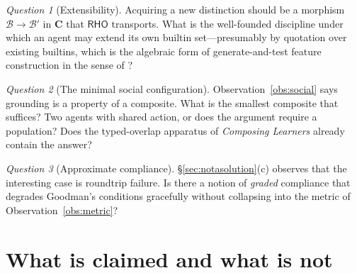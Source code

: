 \documentclass[11pt,a4paper]{article}
\theoremstyle{definition}
\theoremstyle{plain}
\theoremstyle{remark}
\newtheorem{question}{Question}
\newcommand{\RHO}{\mathsf{RHO}}
\newcommand{\Bee}{\mathcal{B}}
\newcommand{\Cat}{\mathbf{C}}
\begin{document}
\begin{question}[Extensibility]
Acquiring a new distinction should be a morphism $\Bee \to \Bee'$ in $\Cat$ that $\RHO$
transports. What is the well-founded discipline under which an agent may extend its own
builtin set---presumably by quotation over existing builtins, which is the algebraic form
of generate-and-test feature construction in the sense of \cite{pierce1997}?
\end{question}

\begin{question}[The minimal social configuration]
Observation~\ref{obs:social} says grounding is a property of a composite. What is the
smallest composite that suffices? Two agents with shared action, or does the argument
require a population? Does the typed-overlap apparatus of \emph{Composing Learners}
already contain the answer?
\end{question}

\begin{question}[Approximate compliance]
\S\ref{sec:notasolution}(c) observes that the interesting case is roundtrip failure. Is
there a notion of \emph{graded} compliance that degrades Goodman's conditions gracefully
without collapsing into the metric of Observation~\ref{obs:metric}?
\end{question}

\section{What is claimed and what is not}
\label{sec:claims}
\end{document}
